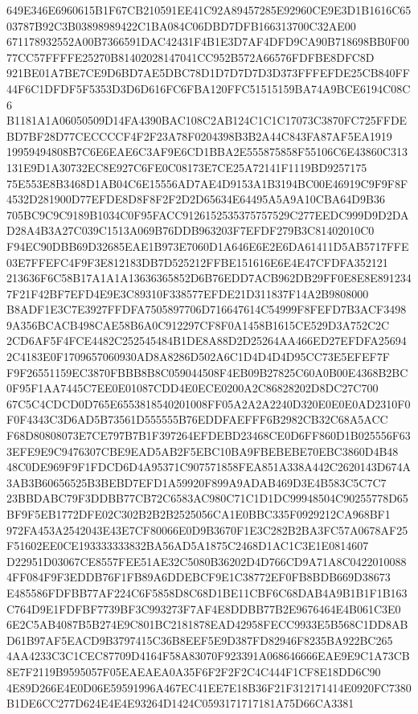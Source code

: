 \documentclass[UTF8,fontset=fandol,zihao=-4,a4paper]{ctexart}
\begin{document}
{{649E346E6960615B1F67CB210591EE41C92A89457285E92960CE9E3D1B1616C6503787B92C3B03898989422C1BA084C06DBD7DFB166313700C32AE00
671178932552A00B7366591DAC42431F4B1E3D7AF4DFD9CA90B718698BB0F0077CC57FFFFE25270B81402028147041CC952B572A66576FDFBE8DFC8D
921BE01A7BE7CE9D6BD7AE5DBC78D1D7D7D7D3D373FFFEFDE25CB840FF44F6C1DFDF5F5353D3D6D616FC6FBA120FFC51515159BA74A9BCE6194C08C6
B1181A1A06050509D14FA4390BAC108C2AB124C1C1C17073C3870FC725FFDEBD7BF28D77CECCCCF4F2F23A78F0204398B3B2A44C843FA87AF5EA1919
19959494808B7C6E6EAE6C3AF9E6CD1BBA2E555875858F55106C6E43860C313131E9D1A30732EC8E927C6FE0C08173E7CE25A72141F1119BD9257175
75E553E8B3468D1AB04C6E15556AD7AE4D9153A1B3194BC00E46919C9F9F8F4532D281900D77EFDE8D8F8F2F2D2D65634E64495A5A9A10CBA64D9B36
705BC9C9C9189B1034C0F95FACC9126152535375757529C277EEDC999D9D2DAD28A4B3A27C039C1513A069B76DDB963203F7EFDF279B3C81402010C0
F94EC90DBB69D32685EAE1B973E7060D1A646E6E2E6DA61411D5AB5717FFE03E7FFEFC4F9F3E812183DB7D525212FFBE151616E6E4E47CFDFA352121
213636F6C58B17A1A1A13636365852D6B76EDD7ACB962DB29FF0E8E8E8912347F21F42BF7EFD4E9E3C89310F338577EFDE21D311837F14A2B9808000
B8ADF1E3C7E3927FFDFA7505897706D716647614C54999F8FEFD7B3ACF34989A356BCACB498CAE58B6A0C912297CF8F0A1458B1615CE529D3A752C2C
2CD6AF5F4FCE4482C252545484B1DE8A88D2D25264AA466ED27EFDFA256942C4183E0F1709657060930AD8A8286D502A6C1D4D4D4D95CC73E5EFEF7F
F9F26551159EC3870FBBB8B8C059044508F4EB09B27825C60A0B00E4368B2BC0F95F1AA7445C7EE0E01087CDD4E0ECE0200A2C86828202D8DC27C700
67C5C4CDCD0D765E6553818540201008FF05A2A2A2240D320E0E0E0AD2310F0F0F4343C3D6AD5B73561D555555B76EDDFAEFFF6B2982CB32C68A5ACC
F68D80808073E7CE797B7B1F397264EFDEBD23468CE0D6FF860D1B025556F633EFE9E9C9476307CBE9EAD5AB2F5EBC10BA9FBEBEBE70EBC3860D4B48
48C0DE969F9F1FDCD6D4A95371C907571858FEA851A338A442C2620143D674A3AB3B60656525B3BEBD7EFD1A59920F899A9ADAB469D3E4B583C5C7C7
23BBDABC79F3DDBB77CB72C6583AC980C71C1D1DC99948504C90255778D65BF9F5EB1772DFE02C302B2B2B2525056CA1E0BBC335F0929212CA968BF1
972FA453A2542043E43E7CF80066E0D9B3670F1E3C282B2BA3FC57A0678AF25F51602EE0CE193333333832BA56AD5A1875C2468D1AC1C3E1E0814607
D22951D03067CE8557FEE51AE32C5080B36202D4D766CD9A71A8C04220100884FF084F9F3EDDB76F1FB89A6DDEBCF9E1C38772EF0FB8BDB669D38673
E485586FDFBB77AF224C6F5858D8C68D1BE11CBF6C68DAB4A9B1B1F1B163C764D9E1FDFBF7739BF3C993273F7AF4E8DDBB77B2E9676464E4B061C3E0
6E2C5AB4087B5B274E9C801BC2181878EAD42958FECC9933E5B568C1DD8ABD61B97AF5EACD9B3797415C36B8EEF5E9D387FD82946F8235BA922BC265
4AA4233C3C1CEC87709D4164F58A83070F923391A068646666EAE9E9C1A73CB8E7F2119B9595057F05EAEAEA0A35F6F2F2F2C4C444F1CF8E18DD6C90
4E89D266E4E0D06E59591996A467EC41EE7E18B36F21F312171414E0920FC7380B1DE6CC277D624E4E4E93264D1424C0593171717181A75D66CA3381
}}
\end{document}
